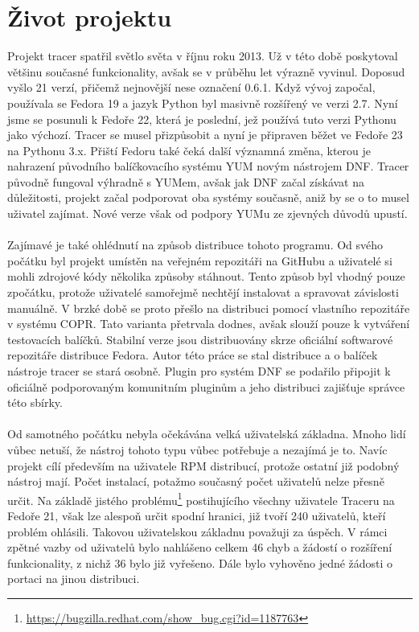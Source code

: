 \documentclass[
  field=inf,
  biblatex,
  glossaries,
  index
]{kidiplom}
\begin{document}
\section{Život projektu}
Projekt tracer spatřil světlo světa v říjnu roku 2013. Už v této době poskytoval většinu současné funkcionality, avšak se v průběhu let výrazně vyvinul. Doposud vyšlo 21 verzí, přičemž nejnovější nese označení 0.6.1. Když vývoj započal, používala se Fedora 19 a jazyk Python byl masivně rozšířený ve verzi 2.7. Nyní jsme se posunuli k Fedoře 22, která je poslední, jež používá tuto verzi Pythonu jako výchozí. Tracer se musel přizpůsobit a nyní je připraven běžet ve Fedoře 23 na Pythonu 3.x. Přiští Fedoru také čeká další významná změna, kterou je nahrazení původního balíčkovacího systému YUM novým nástrojem DNF. Tracer původně fungoval výhradně s YUMem, avšak jak DNF začal získávat na důležitosti, projekt začal podporovat oba systémy současně, aniž by se o to musel uživatel zajímat. Nové verze však od podpory YUMu ze zjevných důvodů upustí.
\\
\\
Zajímavé je také ohlédnutí na způsob distribuce tohoto programu. Od svého počátku byl projekt umístěn na veřejném repozitáři na GitHubu a uživatelé si mohli zdrojové kódy několika způsoby stáhnout. Tento způsob byl vhodný pouze zpočátku, protože uživatelé samořejmě nechtějí instalovat a spravovat závislosti manuálně. V brzké době se proto přešlo na distribuci pomocí vlastního repozitáře v systému COPR. Tato varianta přetrvala dodnes, avšak slouží pouze k vytváření testovacích balíčků. Stabilní verze jsou distribuovány skrze oficiální softwarové repozitáře distribuce Fedora. Autor této práce se stal  distribuce a o balíček nástroje tracer se stará osobně. Plugin pro systém DNF se podařilo připojit k oficiálně podporovaným komunitním pluginům a jeho distribuci zajišťuje správce této sbírky.
\\
\\
Od samotného počátku nebyla očekávána velká uživatelská základna. Mnoho lidí vůbec netuší, že nástroj tohoto typu vůbec potřebuje a nezajímá je to. Navíc projekt cílí především na uživatele RPM distribucí, protože ostatní již podobný nástroj mají. Počet instalací, potažmo současný počet uživatelů nelze přesně určit. Na základě jistého problému\footnote{\url{https://bugzilla.redhat.com/show\_bug.cgi?id=1187763}} postihujícího všechny uživatele Traceru na Fedoře 21, však lze alespoň určit spodní hranici, již tvoří 240 uživatelů, kteří problém ohlásili. Takovou uživatelskou základnu považuji za úspěch. V rámci zpětné vazby od uživatelů bylo nahlášeno celkem 46 chyb a žádostí o rozšíření funkcionality, z nichž 36 bylo již vyřešeno. Dále bylo vyhověno jedné žádosti o portaci na jinou distribuci.
\end{document}
